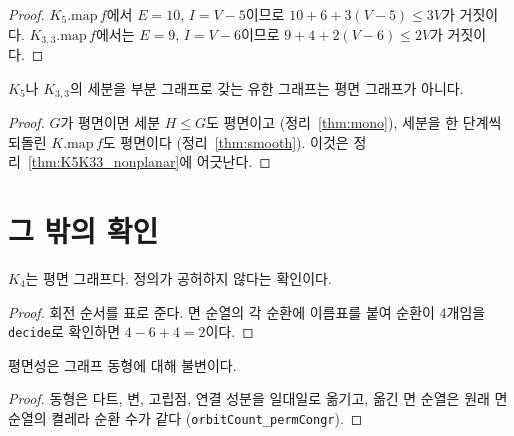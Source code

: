 \begin{proof}
\leanok
{}
\(K_5.\mathrm{map}\,f\)에서 \(E = 10\), \(I = V - 5\)이므로 \(10 + 6 + 3(V - 5) \le 3V\)가 거짓이다.
\(K_{3,3}.\mathrm{map}\,f\)에서는 \(E = 9\), \(I = V - 6\)이므로 \(9 + 4 + 2(V - 6) \le 2V\)가 거짓이다.
\end{proof}

\begin{theorem}[쿠라토프스키 정리, 쉬운 방향]
\label{thm:easy}
\leanok
{}
\(K_5\)나 \(K_{3,3}\)의 세분을 부분 그래프로 갖는 유한 그래프는 평면 그래프가 아니다.
\end{theorem}

\begin{proof}
\leanok
{}
\(G\)가 평면이면 세분 \(H \le G\)도 평면이고 (정리~\ref{thm:mono}), 세분을 한 단계씩 되돌린
\(K.\mathrm{map}\,f\)도 평면이다 (정리~\ref{thm:smooth}). 이것은 정리~\ref{thm:K5K33_nonplanar}에 어긋난다.
\end{proof}

\section{그 밖의 확인}

\begin{theorem}[\(K_4\)는 평면]
\label{thm:K4}
\leanok
{}
\(K_4\)는 평면 그래프다. 정의가 공허하지 않다는 확인이다.
\end{theorem}

\begin{proof}
\leanok
회전 순서를 표로 준다. 면 순열의 각 순환에 이름표를 붙여 순환이 4개임을 \texttt{decide}로 확인하면
\(4 - 6 + 4 = 2\)이다.
\end{proof}

\begin{theorem}[동형 불변]
\label{thm:iso}
\leanok
{}
평면성은 그래프 동형에 대해 불변이다.
\end{theorem}

\begin{proof}
\leanok
동형은 다트, 변, 고립점, 연결 성분을 일대일로 옮기고, 옮긴 면 순열은 원래 면 순열의 켤레라 순환 수가
같다 (\texttt{orbitCount\_permCongr}).
\end{proof}
